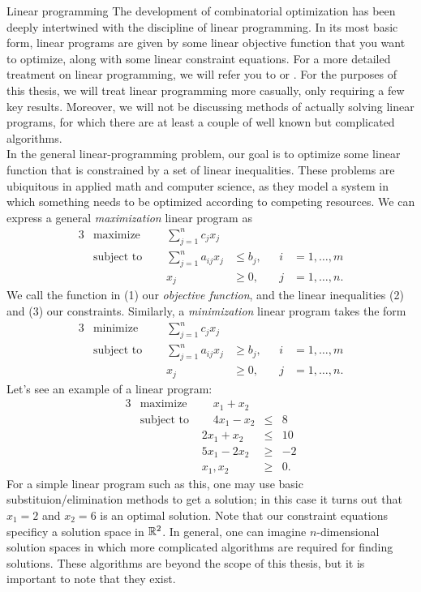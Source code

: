 \begin{section}{Linear programming}
	The development of combinatorial optimization has been deeply intertwined with the discipline 
	of linear programming. In its most basic form, linear programs are given by some linear 
	objective function that you want to optimize, along with some linear constraint equations. 
	For a more detailed treatment on linear programming, we will refer you to 
	\cite{vazirani2002approximation} or \cite{bertsimas1997introduction}.
	For the purposes of this thesis, we will treat linear programming more casually, only requiring 
	a few key results. Moreover, we will not be discussing methods of actually solving linear 
	programs, for which there are at least a couple of well known but complicated algorithms. \\
	In the general linear-programming problem, our goal is to optimize some linear function that 
	is constrained by a set of linear inequalities. These problems are ubiquitous in applied math 
	and computer science, as they model a system in which something needs to be optimized according 
	to competing resources. We can express a general \emph{maximization} linear program as
	\begin{alignat}{3}
		& \text{maximize } & \sum_{j=1}^{n} c_{j} x_{j}& \\
		& \text{subject to } \quad & \sum_{j=1}^{n} a_{ij} x_{j} & \leq b_{j}, & i & = 1, \dots 
		, m \\
				&& x_{j} & \geq 0, \quad & j & = 1, \dots, n.
	\end{alignat}
	We call the function in (1) our \emph{objective function}, and the linear inequalities (2) and 
	(3) our constraints. Similarly, a \emph{minimization} linear program takes the form
	\begin{alignat}{3}
		& \text{minimize } & \sum_{j=1}^{n} c_{j} x_{j}& \\
		& \text{subject to } \quad & \sum_{j=1}^{n} a_{ij} x_{j} & \geq b_{j}, & i & = 1, \dots 
		, m \\
				&& x_{j} & \geq 0, \quad & j & = 1, \dots, n.
	\end{alignat}
	Let's see an example of a linear program:
	\begin{alignat*}{3}
		& \text{maximize } &\quad x_1 + x_2 & \\
		& \text{subject to } &\quad 4x_1 - x_2 &\leq &8 \\
				     && 2x_1 + x_2 &\leq &10 \\
				     && 5x_1 - 2x_2 &\geq &-2 \\
				     && x_1,x_2 & \geq &0.
	\end{alignat*}
	For a simple linear program such as this, one may use basic substituion/elimination methods 
	to get a solution; in this case it turns out that $x_1 = 2$ and $x_2 = 6$ is an optimal 
	solution. Note that our 
	constraint equations specificy a solution space in $\mathbb{R}^2$. In general, one can imagine 
	$n$-dimensional solution spaces in which more complicated algorithms are required for 
	finding solutions. These algorithms are beyond the scope of this thesis, but it is important 
	to note that they exist.
\end{section}
